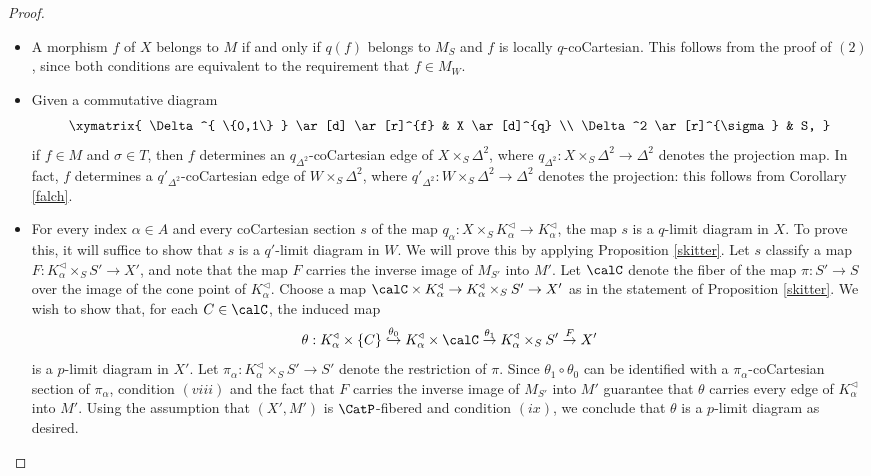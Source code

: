 \begin{proof}
\begin{itemize}
\item[$(3)$] A morphism $f$ of $X$ belongs to $M$ if and only if $q(f)$ belongs to $M_S$ and
$f$ is locally $q$-coCartesian. This follows from the proof of $(2)$, since both conditions
are equivalent to the requirement that $f \in M_W$.

\item[$(4)$] Given a commutative diagram
$$ \xymatrix{ \Delta^{ \{0,1\} } \ar[d] \ar[r]^{f} & X \ar[d]^{q} \\
\Delta^2 \ar[r]^{\sigma} & S, }$$
if $f \in M$ and $\sigma \in T$, then $f$ determines an
$q_{\Delta^2}$-coCartesian edge of $X \times_{S} \Delta^2$, where
$q_{\Delta^2}: X \times_{S} \Delta^2 \rightarrow \Delta^2$ denotes the projection map.
In fact, $f$ determines a $q'_{\Delta^2}$-coCartesian edge of $W \times_{S} \Delta^2$,
where $q'_{\Delta^2}: W \times_{S} \Delta^2 \rightarrow \Delta^2$ denotes the projection:
this follows from Corollary \ref{falch}.

\item[$(6)$] For every index $\alpha \in A$ and every coCartesian section
$s$ of the map $q_{\alpha}: X \times_{S} K_{\alpha}^{\triangleleft} \rightarrow K_{\alpha}^{\triangleleft}$,
the map $s$ is a $q$-limit diagram in $X$. To prove this, it will suffice to show that
$s$ is a $q'$-limit diagram in $W$. We will prove this by applying Proposition \ref{skitter}.
Let $s$ classify a map $F: K_{\alpha}^{\triangleleft} \times_{S} S' \rightarrow X'$, and note
that the map $F$ carries the inverse image of $M_{S'}$ into $M'$.
Let $\calC$ denote the fiber of the map $\pi: S' \rightarrow S$ over the image of the cone point
of $K_{\alpha}^{\triangleleft}$. Choose a map $\calC \times K^{\triangleleft}_{\alpha}
\rightarrow K_{\alpha}^{\triangleleft} \times_{S} S' \rightarrow X'$ as in the statement
of Proposition \ref{skitter}. We wish to show that, for each $C \in \calC$, the induced map
$$\theta: K^{\triangleleft}_{\alpha} \times \{C\} \stackrel{\theta_0}{\hookrightarrow} K^{\triangleleft}_{\alpha} \times \calC
\stackrel{\theta_1}{\rightarrow} K_{\alpha}^{\triangleleft} \times_{S} S' \stackrel{F}{\rightarrow} X'$$
is a $p$-limit diagram in $X'$. Let $\pi_{\alpha}: K_{\alpha}^{\triangleleft} \times_{S} S' \rightarrow S'$
denote the restriction of $\pi$. Since $\theta_1 \circ \theta_0$ can be identified with a
$\pi_{\alpha}$-coCartesian section of $\pi_{\alpha}$, condition $(viii)$ and the fact
that $F$ carries the inverse image of $M_{S'}$ into $M'$ guarantee that 
$\theta$ carries every edge of $K^{\triangleleft}_{\alpha}$ into $M'$. Using the assumption that
$(X', M')$ is $\CatP$-fibered and condition $(ix)$, we conclude that $\theta$ is a $p$-limit diagram as desired.


\end{itemize}
\end{proof}
